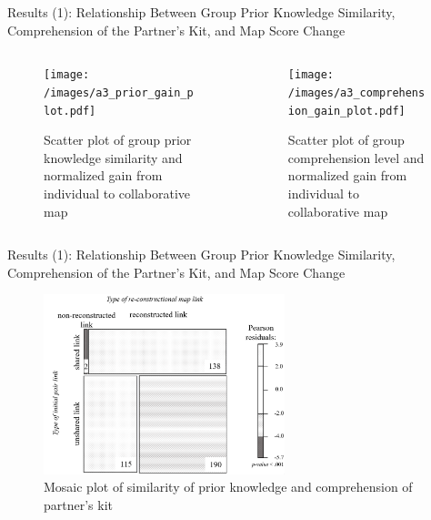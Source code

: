 \begin{frame}{Results (1): Relationship Between Group Prior Knowledge Similarity, 
   Comprehension of the Partner’s Kit, and Map Score Change}
    \begin{columns}
        \begin{column}{0.5\textwidth}
            \begin{center}
                \begin{figure}[tb]
                    \texttt{[image: /images/a3\_prior\_gain\_plot.pdf]}
                    \caption{Scatter plot of group prior knowledge similarity and normalized gain from individual to collaborative map}
                    \label{prior_gain}
                \end{figure}
            \end{center}
        \end{column}
        \begin{column}{0.5\textwidth}  %
            \begin{center}
                \begin{figure}[tb]
                    \texttt{[image: /images/a3\_comprehension\_gain\_plot.pdf]}
                    \caption{Scatter plot of group comprehension level and normalized gain from 
                    individual to collaborative map}
                    \label{comprehension_gain}
                \end{figure}
            \end{center}
        \end{column}
    \end{columns} 
\end{frame}

\begin{frame}{Results (1): Relationship Between Group Prior Knowledge Similarity, 
   Comprehension of the Partner’s Kit, and Map Score Change}
\begin{figure}[tb]
    \begin{center}
        \includegraphics[width=70mm]{images/a3_prior_comprehension_distribution.pdf}
    \end{center}
    \caption{Mosaic plot of similarity of prior knowledge and comprehension of partner's kit}
    \label{prior_comprehension_dist}
\end{figure}
\end{frame}

